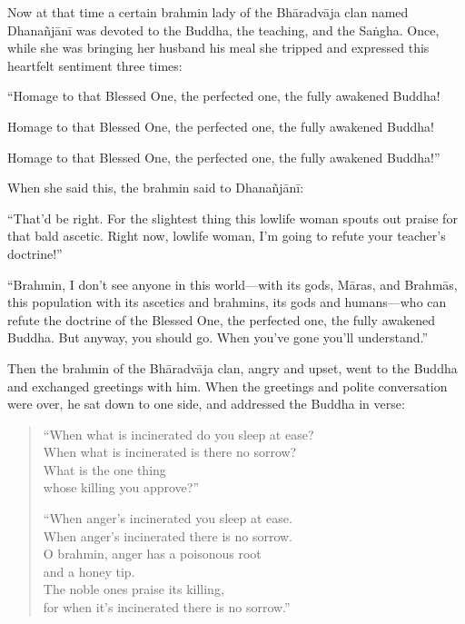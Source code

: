 \documentclass[12pt,openany]{book}%
\begin{document}
Now at that time a certain brahmin lady of the \textsanskrit{Bhāradvāja} clan named \textsanskrit{Dhanañjānī} was devoted to the Buddha, the teaching, and the \textsanskrit{Saṅgha}. Once, while she was bringing her husband his meal she tripped and expressed this heartfelt sentiment three times: 

“Homage to that Blessed One, the perfected one, the fully awakened Buddha! 

Homage to that Blessed One, the perfected one, the fully awakened Buddha! 

Homage to that Blessed One, the perfected one, the fully awakened Buddha!” 

When she said this, the brahmin said to \textsanskrit{Dhanañjānī}: 

“That’d be right. For the slightest thing this lowlife woman spouts out praise for that bald ascetic. Right now, lowlife woman, I’m going to refute your teacher’s doctrine!” 

“Brahmin, I don’t see anyone in this world—with its gods, \textsanskrit{Māras}, and \textsanskrit{Brahmās}, this population with its ascetics and brahmins, its gods and humans—who can refute the doctrine of the Blessed One, the perfected one, the fully awakened Buddha. But anyway, you should go. When you’ve gone you’ll understand.” 

Then the brahmin of the \textsanskrit{Bhāradvāja} clan, angry and upset, went to the Buddha and exchanged greetings with him. When the greetings and polite conversation were over, he sat down to one side, and addressed the Buddha in verse: 

\begin{verse}%
“When what is incinerated do you sleep at ease? \\
When what is incinerated is there no sorrow? \\
What is the one thing \\
whose killing you approve?” 

“When anger’s incinerated you sleep at ease. \\
When anger’s incinerated there is no sorrow. \\
O brahmin, anger has a poisonous root \\
and a honey tip. \\
The noble ones praise its killing, \\
for when it’s incinerated there is no sorrow.” 

%
\end{verse}
\end{document}
